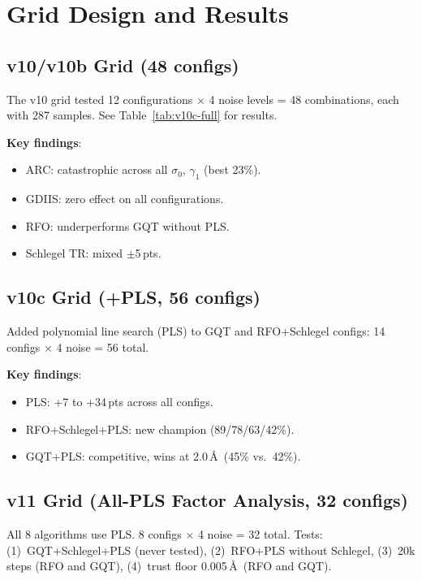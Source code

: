 \documentclass[11pt,a4paper]{article}
\theoremstyle{definition}
\begin{document}
\section{Grid Design and Results}
\label{sec:grid}

\subsection{v10/v10b Grid (48 configs)}

The v10 grid tested 12 configurations $\times$ 4 noise levels = 48
combinations, each with 287 samples.  See Table~\ref{tab:v10c-full}
for results.

\textbf{Key findings}:
\begin{itemize}[nosep]
  \item ARC: catastrophic across all $\sigma_0$, $\gamma_1$ (best 23\%).
  \item GDIIS: zero effect on all configurations.
  \item RFO: underperforms GQT without PLS.
  \item Schlegel TR: mixed $\pm$5\,pts.
\end{itemize}

\subsection{v10c Grid (+PLS, 56 configs)}

Added polynomial line search (PLS) to GQT and RFO+Schlegel configs:
14 configs $\times$ 4 noise = 56 total.

\textbf{Key findings}:
\begin{itemize}[nosep]
  \item PLS: +7 to +34\,pts across all configs.
  \item RFO+Schlegel+PLS: new champion (89/78/63/42\%).
  \item GQT+PLS: competitive, wins at 2.0\,\AA\ (45\% vs.\ 42\%).
\end{itemize}

\subsection{v11 Grid (All-PLS Factor Analysis, 32 configs)}

All 8 algorithms use PLS.  8 configs $\times$ 4 noise = 32 total.
Tests: (1)~GQT+Schlegel+PLS (never tested), (2)~RFO+PLS without Schlegel,
(3)~20k steps (RFO and GQT), (4)~trust floor 0.005\,\AA\ (RFO and GQT).
\end{document}
